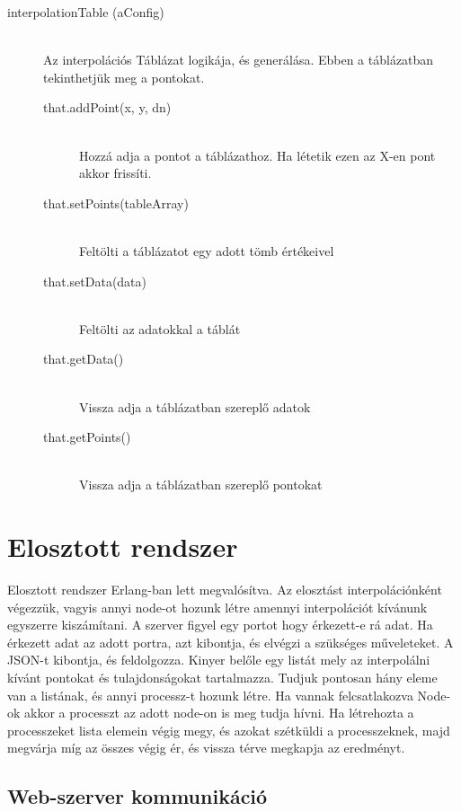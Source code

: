 \begin{description}
		\item[interpolationTable (aConfig)]
			\hfill \\ 
				Az interpolációs Táblázat logikája, és generálása. Ebben a táblázatban tekinthetjük meg a pontokat.
			\begin{description}
			\item[that.addPoint(x, y, dn)] 
			\hfill \\ Hozzá adja a pontot a táblázathoz. Ha létetik ezen az X-en pont akkor frissíti.
			\item[that.setPoints(tableArray)] 
			\hfill \\ Feltölti a táblázatot egy adott tömb értékeivel
			\item[that.setData(data)] 
			\hfill \\ Feltölti az adatokkal a táblát
			\item[that.getData()] 
			\hfill \\ Vissza adja a táblázatban szereplő adatok
			\item[that.getPoints()] 
			\hfill \\ Vissza adja a táblázatban szereplő pontokat
			\end{description}
	\end{description}

\section{Elosztott rendszer}
Elosztott rendszer Erlang-ban lett megvalósítva. Az elosztást interpolációnként végezzük, vagyis annyi node-ot hozunk létre amennyi interpolációt kívánunk egyszerre kiszámítani. \newline
A szerver figyel egy portot hogy érkezett-e rá adat. Ha érkezett adat az adott portra, azt kibontja, és elvégzi a szükséges műveleteket. A JSON-t kibontja, és feldolgozza. Kinyer belőle egy listát mely az interpolálni kívánt pontokat és tulajdonságokat tartalmazza. \newline
Tudjuk pontosan hány eleme van a listának, és annyi processz-t hozunk létre. Ha vannak felcsatlakozva Node-ok akkor a processzt az adott node-on is meg tudja hívni.
Ha létrehozta a processzeket lista elemein végig megy, és azokat szétküldi a processzeknek, majd megvárja míg az összes végig ér, és vissza térve megkapja az eredményt.
\subsection{Web-szerver kommunikáció}
